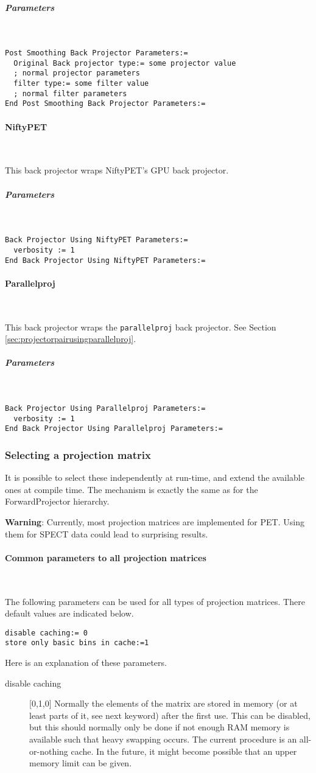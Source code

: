 \documentclass{article}
\newcommand{\subsubsubsection}[1]{\paragraph{#1}\mbox{} \\}
\newcommand{\subsubsubsubsection}[1]{\subparagraph{#1} \mbox{} \\}
\begin{document}
{{{ \subsubsubsubsection{Parameters}
}
\begin{verbatim}
Post Smoothing Back Projector Parameters:=
  Original Back projector type:= some projector value 
  ; normal projector parameters
  filter type:= some filter value
  ; normal filter parameters
End Post Smoothing Back Projector Parameters:=
\end{verbatim}

{ \subsubsubsection{NiftyPET}
}
This back projector wraps NiftyPET's GPU back projector.

{ \subsubsubsubsection{Parameters}
}
\begin{verbatim}
Back Projector Using NiftyPET Parameters:=
  verbosity := 1
End Back Projector Using NiftyPET Parameters:=
\end{verbatim}

{ \subsubsubsection{Parallelproj}
}
This back projector wraps the \texttt{parallelproj} back projector.
See Section \ref{sec:projectorpairusingparallelproj}.

{ \subsubsubsubsection{Parameters}
}
\begin{verbatim}
Back Projector Using Parallelproj Parameters:=
  verbosity := 1
End Back Projector Using Parallelproj Parameters:=
\end{verbatim}

\subsubsection{
Selecting a projection matrix}
\label{sec:projmatrix}
It is possible to select these independently at run-time, and 
extend the available ones at compile time. The mechanism is exactly 
the same as for the ForwardProjector hierarchy.

\textbf{Warning}: Currently, most projection matrices are implemented for PET. Using them for 
SPECT data could lead to surprising results. 

{ \subsubsubsection{Common parameters to all projection matrices}
}
\label{sec:projmatrixcommon}
The following parameters can be used for all types of projection 
matrices. There default values are indicated below.

\begin{verbatim}
disable caching:= 0
store only basic bins in cache:=1
\end{verbatim}

Here is an explanation of these parameters.

\begin{description}
\item[disable caching] [0,1,0{]}
Normally the elements of the matrix are stored in memory (or 
at least parts of it, see next keyword) after the first use. 
This can be disabled, but this should normally only be done if 
not enough RAM memory is available such that heavy swapping occurs. 
The current procedure is an all-or-nothing cache. In the future, 
it might become possible that an upper memory limit can be given.



\end{description}}}
\end{document}
